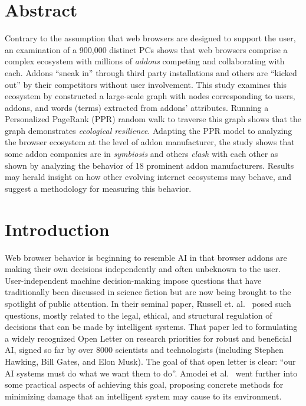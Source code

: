 \documentclass[10pt,letterpaper]{article}
\begin{document}
\section*{Abstract}
Contrary to the assumption that web browsers are designed to support the user, an examination of a 900,000 distinct PCs shows that web browsers comprise a complex ecosystem with millions of \textit{addons} competing and collaborating with each. Addons ``sneak in'' through third party installations and others are ``kicked out'' by their competitors without user involvement. This study examines this ecosystem by constructed a large-scale graph with nodes corresponding to users, addons, and words (terms) extracted from addons' attributes. Running a Personalized PageRank (PPR) random walk to traverse this graph shows that the graph demonstrates \textit{ecological resilience}. Adapting the PPR model to analyzing the browser ecosystem at the level of addon manufacturer, the study shows that some addon companies are in \textit{symbiosis} and others \textit{clash} with each other as shown by analyzing the behavior of 18 prominent addon manufacturers. Results may herald insight on how other evolving internet ecosystems may behave, and suggest a methodology for measuring this behavior. 



\linenumbers

\section*{Introduction}

Web browser behavior is beginning to resemble AI in that browser addons are making their own decisions independently and often unbeknown to the user. User-independent machine decision-making impose questions that have traditionally been discussed in science fiction but are now being brought to the spotlight of public attention. In their seminal paper, Russell et. al.~\cite{russell2016research} posed such questions, mostly related to the legal, ethical, and structural regulation of decisions that can be made by intelligent systems. That paper led to formulating a widely recognized Open Letter on research priorities for robust and beneficial AI, signed so far by over 8000 scientists and technologists (including Stephen Hawking, Bill Gates, and Elon Musk). The goal of that open letter is clear: ``our AI systems must do what we want them to do''. Amodei et al.~\cite{amodei2016concrete} went further into some practical aspects of achieving this goal, proposing concrete methods for minimizing damage that an intelligent system may cause to its environment. 
\end{document}
